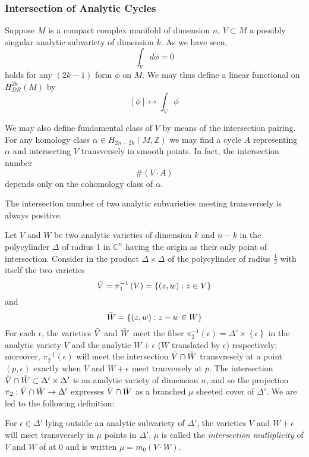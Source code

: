 \subsubsection{Intersection of Analytic Cycles}

\indent Suppose $M$ is a compact complex manifold of dimension $n$, $V \subset M$ a possibly singular analytic subvariety of dimension $k$. As we have seen, 
\[
	\int_V d\phi = 0
\]
holds for any $(2k-1)$ form $  \phi$ on $M$. We may thus define a linear functional on $H^{2k}_{DR} (M)$ by 
\[
	\left[ \phi \right] \mapsto \int_V \phi
\]

We may also define fundamental class of $V$ by means of the intersection pairing. For any homology class $ \alpha \in H_{2n-2k} \left( M, \mathbb{Z} \right) $ we may find a cycle $A$ representing $ \alpha$ and intersecting $V$ transversely in smooth points. In fact, the intersection number
\[
	\# \left( V \cdot A \right)
\]
depends only on the cohomology class of $ \alpha $.

\begin{prop}
	The intersection number of two analytic subvarieties meeting transversely is always positive.
\end{prop}

Let $V$ and $W$ be two analytic varieties of dimension $k$ and $n-k$ in the polycylinder $\Delta$ of radius 1 in $ \mathbb{C}^n$ having the origin as their only point of intersection. Consider in the product $ \Delta \times \Delta$ of the polycylinder of radius $ \frac{1}{2} $ with itself the two varieties
\[
	\Tilde{V} = \pi_1^{-1} \left( V \right) = \left\{ \left( z,w \right): z \in V \right\} 
\]
and
\[
	\Tilde{W} = \left\{ (z,w): z-w \in W \right\}
\]
For each $ \epsilon $, the varieties $ \Tilde{V}$ and $ \Tilde{W}$ meet the fiber $ \pi_2^{-1} \left( \epsilon \right) = \Delta' \times \left\{ \epsilon \right\}$ in the analytic variety $V$ and the analytic $W + \epsilon$ ($W$ translated by $ \epsilon$) respectively; moreover, $ \pi_2^{-1} \left( \epsilon \right)$ will meet the intersection $ \Tilde{V} \cap \Tilde{W}$ transvresely at a point $ \left( p, \epsilon \right)$ exactly when $V$ and $ W + \epsilon$ meet tranversely at $p$. The intersection $ \Tilde{V} \cap \Tilde{W} \subset \Delta' \times \Delta'$ is an analytic variety of dimension $n$, and so the projection $ \pi_2: \Tilde{V} \cap \Tilde{W} \to \Delta'$ expresses $ \Tilde{V} \cap \Tilde{W}$ as a branched $ \mu$ sheeted cover of $ \Delta'$. We are led to the following definition:

\begin{defn}
	For $ \epsilon \in \Delta'$ lying outside an analytic subvariety of $ \Delta'$, the varieties $V$ and $W + \epsilon$ will meet transversely in $ \mu$ points in $ \Delta'$. $ \mu$ is called the \textit{intersection mutliplicity} of $V$ and $W$ of at 0 and is written $ \mu = m_0 (V \cdot W)$.
\end{defn}

